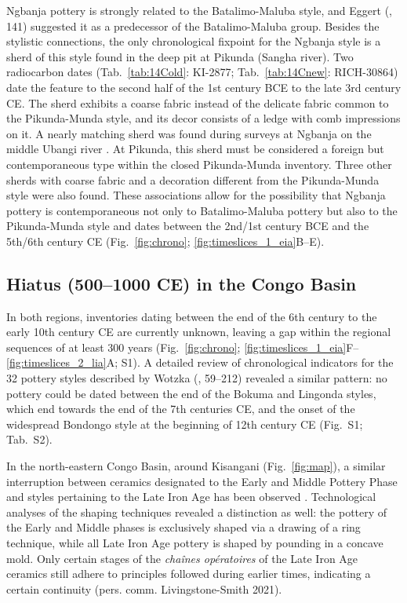 \documentclass[smallextended,natbib]{svjour3}       %
\begin{document}
Ngbanja pottery is strongly related to the Batalimo-Maluba style, and Eggert (\citeyear{Eggert.1987a}, 141) suggested it as a predecessor of the Batalimo-Maluba group. Besides the stylistic connections, the only chronological fixpoint for the Ngbanja style is a sherd of this style found in the deep pit at Pikunda (Sangha river). Two radiocarbon dates (Tab.~\ref{tab:14Cold}: KI-2877; Tab.~\ref{tab:14Cnew}: RICH-30864) date the feature to the second half of the 1st century BCE to the late 3rd century CE. The sherd exhibits a coarse fabric instead of the delicate fabric common to the Pikunda-Munda style, and its decor consists of a ledge with comb impressions on it. A nearly matching sherd was found during surveys at Ngbanja on the middle Ubangi river \citep[83 Fig.~26.7--8]{Seidensticker.2021e}. At Pikunda, this sherd must be considered a foreign but contemporaneous type within the closed Pikunda-Munda inventory. Three other sherds with coarse fabric and a decoration different from the Pikunda-Munda style were also found. These associations allow for the possibility that Ngbanja pottery is contemporaneous not only to Batalimo-Maluba pottery but also to the Pikunda-Munda style and dates between the 2nd/1st century BCE and the 5th/6th century CE (Fig.~\ref{fig:chrono}; \ref{fig:timeslices_1_eia}B--E).

\subsection*{Hiatus (500--1000 CE) in the Congo Basin}

In both regions, inventories dating between the end of the 6th century to the early 10th century CE are currently unknown, leaving a gap within the regional sequences of at least 300 years (Fig.~\ref{fig:chrono}; \ref{fig:timeslices_1_eia}F--\ref{fig:timeslices_2_lia}A; S1). A detailed review of chronological indicators for the 32 pottery styles described by Wotzka (\citeyear{Wotzka.1995}, 59--212) revealed a similar pattern: no pottery could be dated between the end of the Bokuma and Lingonda styles, which end towards the end of the 7th centuries CE, and the onset of the widespread Bondongo style at the beginning of 12th century CE (Fig.~S1; Tab.~S2).

In the north-eastern Congo Basin, around Kisangani (Fig.~\ref{fig:map}), a similar interruption between ceramics designated to the Early and Middle Pottery Phase and styles pertaining to the Late Iron Age has been observed \citep[Fig.~\ref{fig:chrono}; S1]{LivingstoneSmith.2017}. Technological analyses of the shaping techniques revealed a distinction as well: the pottery of the Early and Middle phases is exclusively shaped via a drawing of a ring technique, while all Late Iron Age pottery is shaped by pounding in a concave mold. Only certain stages of the \textit{chaînes opératoires} of the Late Iron Age ceramics still adhere to principles followed during earlier times, indicating a certain continuity (pers. comm. Livingstone-Smith 2021).
\end{document}
